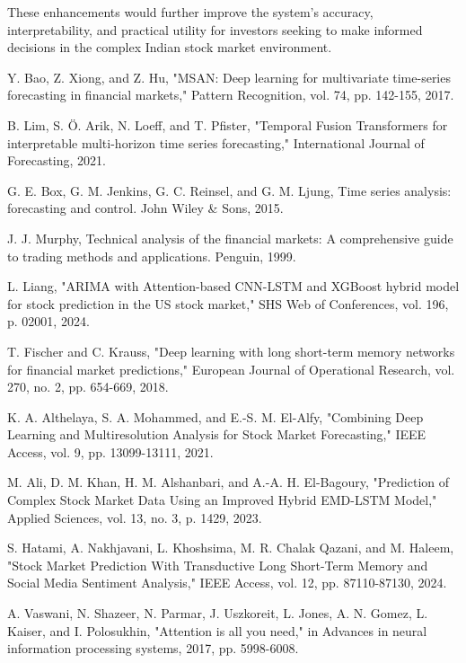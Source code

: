 \documentclass[conference]{IEEEtran}
\begin{document}
These enhancements would further improve the system's accuracy, interpretability, and practical utility for investors seeking to make informed decisions in the complex Indian stock market environment.

\begin{thebibliography}{00}
 Y. Bao, Z. Xiong, and Z. Hu, "MSAN: Deep learning for multivariate time-series forecasting in financial markets," Pattern Recognition, vol. 74, pp. 142-155, 2017.

 B. Lim, S. Ö. Arik, N. Loeff, and T. Pfister, "Temporal Fusion Transformers for interpretable multi-horizon time series forecasting," International Journal of Forecasting, 2021.

 G. E. Box, G. M. Jenkins, G. C. Reinsel, and G. M. Ljung, Time series analysis: forecasting and control. John Wiley \& Sons, 2015.

 J. J. Murphy, Technical analysis of the financial markets: A comprehensive guide to trading methods and applications. Penguin, 1999.

 L. Liang, "ARIMA with Attention-based CNN-LSTM and XGBoost hybrid model for stock prediction in the US stock market," SHS Web of Conferences, vol. 196, p. 02001, 2024.

 T. Fischer and C. Krauss, "Deep learning with long short-term memory networks for financial market predictions," European Journal of Operational Research, vol. 270, no. 2, pp. 654-669, 2018.

 K. A. Althelaya, S. A. Mohammed, and E.-S. M. El-Alfy, "Combining Deep Learning and Multiresolution Analysis for Stock Market Forecasting," IEEE Access, vol. 9, pp. 13099-13111, 2021.

 M. Ali, D. M. Khan, H. M. Alshanbari, and A.-A. H. El-Bagoury, "Prediction of Complex Stock Market Data Using an Improved Hybrid EMD-LSTM Model," Applied Sciences, vol. 13, no. 3, p. 1429, 2023.

 S. Hatami, A. Nakhjavani, L. Khoshsima, M. R. Chalak Qazani, and M. Haleem, "Stock Market Prediction With Transductive Long Short-Term Memory and Social Media Sentiment Analysis," IEEE Access, vol. 12, pp. 87110-87130, 2024.

 A. Vaswani, N. Shazeer, N. Parmar, J. Uszkoreit, L. Jones, A. N. Gomez, L. Kaiser, and I. Polosukhin, "Attention is all you need," in Advances in neural information processing systems, 2017, pp. 5998-6008.


\end{thebibliography}
\end{document}
